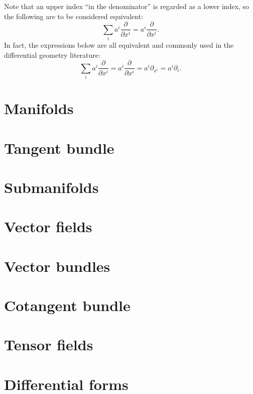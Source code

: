 \documentclass[nobib, a4paper]{tufte-book}
\theoremstyle{plain}
\theoremstyle{definition}
\theoremstyle{remark}
\begin{document}
Note that an upper index ``in the denominator'' is regarded as a lower index, so the following are to be considered equivalent:
\begin{equation}
	\sum_{i} a^i \frac{\partial}{\partial x^i} = a^i \frac{\partial}{\partial x^i}.
\end{equation}
In fact, the expressions below are all equivalent and commonly used in the differential geometry literature:
\begin{equation}
	\sum_{i} a^i \frac{\partial}{\partial x^i} = a^i \frac{\partial}{\partial x^i} = a^i \partial_{x^i} = a^i \partial_i.
\end{equation}

\chapter{Manifolds}\label{ch:manifolds}


\chapter{Tangent bundle}\label{ch:2}


\chapter{Submanifolds}\label{ch:sub}


\chapter{Vector fields}\label{ch:vf}


\chapter{Vector bundles}\label{sec:vectorbundle}


\chapter{Cotangent bundle}\label{cg:ctb}


\chapter{Tensor fields}\label{cg:tf}


\chapter{Differential forms}

\end{document}
